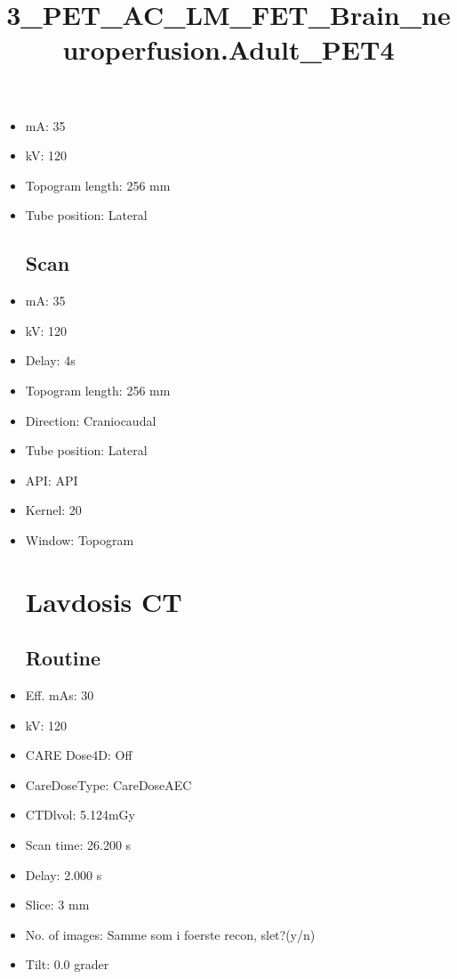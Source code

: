 \documentclass[12pt]{article}
\title{3\_PET\_AC\_LM\_FET\_Brain\_neuroperfusion.Adult\_PET4}
\begin{document}
\maketitle
\newpage
\tableofcontents
\newpage
{}


\begin{itemize}\section{Topogram}
\subsection{Routine}
\item mA: 35\item kV: 120\item Topogram length: 256 mm\item Tube position: Lateral
\subsection{Scan}\item mA: 35\item kV: 120\item Delay: 4s\item Topogram length: 256 mm\item Direction: Craniocaudal\item Tube position: Lateral\item API: API \item Kernel: 20\item Window: Topogram
\section{Lavdosis CT}
\subsection{Routine}
\item Eff. mAs: 30\item kV: 120\item CARE Dose4D: Off\item CareDoseType: CareDoseAEC\item CTDlvol: 5.124mGy\item Scan time: 26.200 s\item Delay: 2.000 s\item Slice: 3 mm\item No. of images: Samme som i foerste recon, slet?(y/n)\item Tilt: 0.0 grader

\end{itemize}
\end{document}
